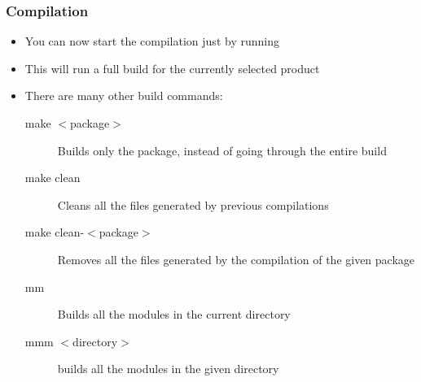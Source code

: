 \begin{frame}[fragile]
  \frametitle{Compilation}
  \begin{itemize}
  \item You can now start the compilation just by running 
  \item This will run a full build for the currently selected product
  \item There are many other build commands:
    \begin{description}
    \item[make $<$package$>$] Builds only the package, instead of
      going through the entire build
    \item[make clean] Cleans all the files generated by previous
      compilations
    \item[make clean-$<$package$>$] Removes all the files generated by
      the compilation of the given package
    \item[mm] Builds all the modules in the current directory
    \item[mmm $<$directory$>$] builds all the modules in the given
      directory
    \end{description}
  \end{itemize}
\end{frame}
